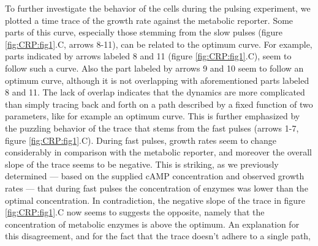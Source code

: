 To further investigate the behavior of the cells during the pulsing experiment,
we plotted a time trace of the growth rate against the metabolic reporter.
%
Some parts of this curve, especially those stemming from the slow pulses (figure \ref{fig:CRP:fig1}.C, arrows 8-11), can be related to the optimum curve.
%
For example, parts indicated by arrows labeled 8 and 11 (figure \ref{fig:CRP:fig1}.C), seem to follow such a curve.
Also the part labeled by arrows 9 and 10 seem to follow an optimum curve, although it is not overlapping 
with aforementioned parts labeled 8 and 11.
%
The lack of overlap indicates that the dynamics 
are more complicated
than simply 
tracing back and forth on a path described by a fixed function of two parameters, like for example an optimum curve.
%
This is further emphasized by the puzzling behavior of the trace that stems from the fast pulses (arrows 1-7, figure \ref{fig:CRP:fig1}.C).
%
During fast pulses, growth rates seem to change considerably in comparison with the metabolic reporter,
and moreover the overall slope of the trace seems to be negative.
%
This is striking, as we previously 
%
determined --- based on the supplied cAMP concentration and observed growth rates --- 
that during fast pulses the concentration of enzymes was lower than the optimal concentration.
%
In contradiction, the negative slope of the trace in figure \ref{fig:CRP:fig1}.C now seems to suggests the opposite, 
namely that the concentration of metabolic enzymes is above the optimum.
%
An explanation for this disagreement, and for the fact that the trace doesn't adhere to a single path, 
